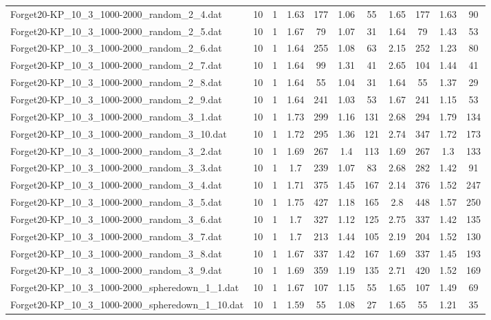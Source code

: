 \begin{table}[!ht]
\begin{tabular}{lcccccccccc}
Forget20-KP\_10\_3\_1000-2000\_random\_2\_4.dat & 10 & 1 & 1.63 & 177 & 1.06 & 55 & 1.65 & 177 & 1.63 & 90 \\
Forget20-KP\_10\_3\_1000-2000\_random\_2\_5.dat & 10 & 1 & 1.67 & 79 & 1.07 & 31 & 1.64 & 79 & 1.43 & 53 \\
Forget20-KP\_10\_3\_1000-2000\_random\_2\_6.dat & 10 & 1 & 1.64 & 255 & 1.08 & 63 & 2.15 & 252 & 1.23 & 80 \\
Forget20-KP\_10\_3\_1000-2000\_random\_2\_7.dat & 10 & 1 & 1.64 & 99 & 1.31 & 41 & 2.65 & 104 & 1.44 & 41 \\
Forget20-KP\_10\_3\_1000-2000\_random\_2\_8.dat & 10 & 1 & 1.64 & 55 & 1.04 & 31 & 1.64 & 55 & 1.37 & 29 \\
Forget20-KP\_10\_3\_1000-2000\_random\_2\_9.dat & 10 & 1 & 1.64 & 241 & 1.03 & 53 & 1.67 & 241 & 1.15 & 53 \\
Forget20-KP\_10\_3\_1000-2000\_random\_3\_1.dat & 10 & 1 & 1.73 & 299 & 1.16 & 131 & 2.68 & 294 & 1.79 & 134 \\
Forget20-KP\_10\_3\_1000-2000\_random\_3\_10.dat & 10 & 1 & 1.72 & 295 & 1.36 & 121 & 2.74 & 347 & 1.72 & 173 \\
Forget20-KP\_10\_3\_1000-2000\_random\_3\_2.dat & 10 & 1 & 1.69 & 267 & 1.4 & 113 & 1.69 & 267 & 1.3 & 133 \\
Forget20-KP\_10\_3\_1000-2000\_random\_3\_3.dat & 10 & 1 & 1.7 & 239 & 1.07 & 83 & 2.68 & 282 & 1.42 & 91 \\
Forget20-KP\_10\_3\_1000-2000\_random\_3\_4.dat & 10 & 1 & 1.71 & 375 & 1.45 & 167 & 2.14 & 376 & 1.52 & 247 \\
Forget20-KP\_10\_3\_1000-2000\_random\_3\_5.dat & 10 & 1 & 1.75 & 427 & 1.18 & 165 & 2.8 & 448 & 1.57 & 250 \\
Forget20-KP\_10\_3\_1000-2000\_random\_3\_6.dat & 10 & 1 & 1.7 & 327 & 1.12 & 125 & 2.75 & 337 & 1.42 & 135 \\
Forget20-KP\_10\_3\_1000-2000\_random\_3\_7.dat & 10 & 1 & 1.7 & 213 & 1.44 & 105 & 2.19 & 204 & 1.52 & 130 \\
Forget20-KP\_10\_3\_1000-2000\_random\_3\_8.dat & 10 & 1 & 1.67 & 337 & 1.42 & 167 & 1.69 & 337 & 1.45 & 193 \\
Forget20-KP\_10\_3\_1000-2000\_random\_3\_9.dat & 10 & 1 & 1.69 & 359 & 1.19 & 135 & 2.71 & 420 & 1.52 & 169 \\
Forget20-KP\_10\_3\_1000-2000\_spheredown\_1\_1.dat & 10 & 1 & 1.67 & 107 & 1.15 & 55 & 1.65 & 107 & 1.49 & 69 \\
Forget20-KP\_10\_3\_1000-2000\_spheredown\_1\_10.dat & 10 & 1 & 1.59 & 55 & 1.08 & 27 & 1.65 & 55 & 1.21 & 35 \\

\end{tabular}
\end{table}
